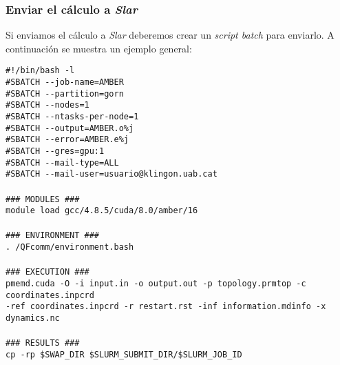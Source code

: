         \subsubsection{Enviar el cálculo a \textit{Slar}}
            Si enviamos el cálculo a \textit{Slar} deberemos crear un \textit{script batch} para enviarlo. A continuación se muestra un ejemplo general:\ \\
            \begin{adjustwidth}{1.0cm}{}
            \texttt{\#!/bin/bash -l                                     \\
                \#SBATCH -{}-job-name=AMBER                         \\
                \#SBATCH -{}-partition=gorn                         \\
                \#SBATCH -{}-nodes=1                                \\
                \#SBATCH -{}-ntasks-per-node=1                      \\
                \#SBATCH -{}-output=AMBER.o\%j                      \\
                \#SBATCH -{}-error=AMBER.e\%j                       \\
                \#SBATCH -{}-gres=gpu:1                             \\
                \#SBATCH -{}-mail-type=ALL                          \\
                \#SBATCH -{}-mail-user=usuario@klingon.uab.cat      \\
                                                                    \\
                \#\#\# MODULES \#\#\#                               \\
                module load gcc/4.8.5/cuda/8.0/amber/16             \\
                                                                    \\
                \#\#\# ENVIRONMENT \#\#\#                           \\
                . /QFcomm/environment.bash                          \\
                                                                    \\
                \#\#\# EXECUTION \#\#\#                             \\
                pmemd.cuda -O -i input.in -o output.out -p topology.prmtop -c coordinates.inpcrd \\
                    \indent -ref coordinates.inpcrd -r restart.rst -inf information.mdinfo -x dynamics.nc  \\
                                                                    \\
                \#\#\# RESULTS \#\#\#                               \\
                cp -rp \$SWAP\_DIR \$SLURM\_SUBMIT\_DIR/\$SLURM\_JOB\_ID    \\
            }\end{adjustwidth}
                
